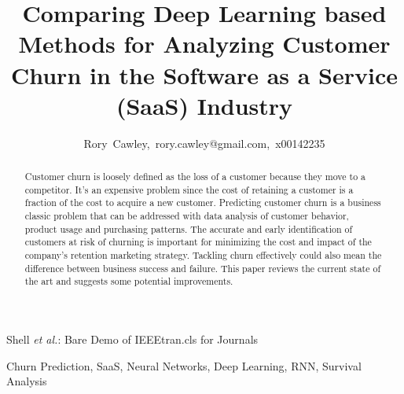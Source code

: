 \documentclass[final,a4paper,peerreviewca]{IEEEtran}
\begin{document}
%
\title{Comparing Deep Learning based Methods for Analyzing Customer Churn in the Software as a Service (SaaS) Industry}

\author{Rory~Cawley,~rory.cawley@gmail.com,~x00142235
}

%
{Shell \MakeLowercase{\textit{et al.}}: Bare Demo of IEEEtran.cls for Journals}

\maketitle

\begin{abstract}
Customer churn is loosely defined as the loss of a customer because they move to a competitor. It’s an expensive problem since the cost of retaining a customer is a fraction of the cost to acquire a new customer. Predicting customer churn is a business classic problem that can be addressed with data analysis of customer behavior, product usage and purchasing patterns. The accurate and early identification of customers at risk of churning is important for minimizing the cost and impact of the company's retention marketing strategy. Tackling churn effectively could also mean the difference between business success and failure. This paper reviews the current state of the art and suggests some potential improvements.
\end{abstract}


\begin{IEEEkeywords}
Churn Prediction, SaaS, Neural Networks, Deep Learning, RNN, Survival Analysis
\end{IEEEkeywords}

%
\IEEEpeerreviewmaketitle
\end{document}
